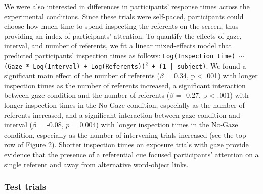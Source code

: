 \documentclass[oneside]{report}
\begin{document}
We were also interested in differences in participants' response times
across the experimental conditions. Since these trials were self-paced,
participants could choose how much time to spend inspecting the
referents on the screen, thus providing an index of participants'
attention. To quantify the effects of gaze, interval, and number of
referents, we fit a linear mixed-effects model that predicted
participants' inspection times as follows:
\texttt{Log(Inspection time) $\sim$ (Gaze * Log(Interval) + Log(Referents))$^2$ + (1 | subject)}.
We found a significant main effect of the number of referents (\(\beta\)
= 0.34, p \textless{} .001) with longer inspection times as the number
of referents increased, a significant interaction between gaze condition
and the number of referents (\(\beta\) = -0.27, p \textless{} .001) with
longer inspection times in the No-Gaze condition, especially as the
number of referents increased, and a significant interaction between
gaze condition and interval (\(\beta\) = -0.08, \(p\) = 0.004) with
longer inspection times in the No-Gaze condition, especially as the
number of intervening trials increased (see the top row of Figure 2).
Shorter inspection times on exposure trials with gaze provide evidence
that the presence of a referential cue focused participants' attention
on a single referent and away from alternative word-object links.

\hypertarget{test-trials}{%
\subsubsection{Test trials}\label{test-trials}}
\end{document}
